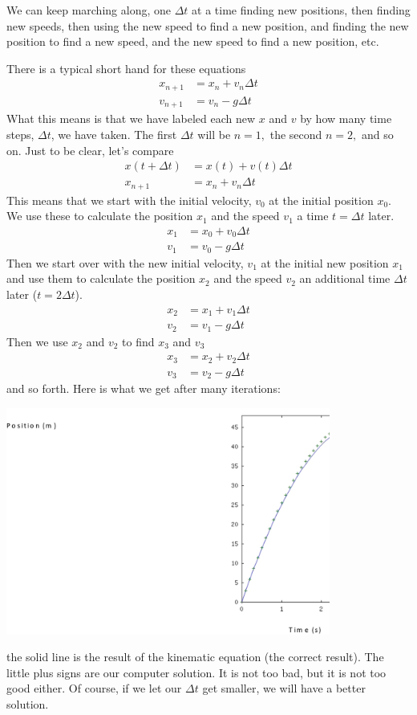 \documentclass[twoside,11pt,ShortChapTitles]{BYUTextbook}
\begin{document}
We can keep marching along, one $\Delta t$ at a time finding new positions,
then finding new speeds, then using the new speed to find a new position, and
finding the new position to find a new speed, and the new speed to find a new
position, etc.

There is a typical short hand for these equations \begin{align*}
x_{n+1}  & =x_{n}+v_{n}\Delta t\\
v_{n+1}  & =v_{n}-g\Delta t
\end{align*}
What this means is that we have labeled each new $x$ and $v$ by how many time
steps, $\Delta t$, we have taken. The first $\Delta t$ will be $n=1,$ the
second $n=2,$ and so on. Just to be clear, let's compare \begin{align*}
x(t+\Delta t)  & =x(t)+v(t)\Delta t\\
x_{n+1}  & =x_{n}+v_{n}\Delta t
\end{align*}
This means that we start with the initial velocity, $v_{0}$ at the initial
position $x_{0}.$ We use these to calculate the position $x_{1}$ and the speed
$v_{1}$ a time $t=\Delta t$ later.
\begin{align*}
x_{1}  & =x_{0}+v_{0}\Delta t\\
v_{1}  & =v_{0}-g\Delta t
\end{align*}
Then we start over with the new initial velocity, $v_{1}$ at the initial new
position $x_{1}$ and use them to calculate the position $x_{2}$ and the speed
$v_{2}$ an additional time $\Delta t$ later ($t=2\Delta t$).
\begin{align*}
x_{2}  & =x_{1}+v_{1}\Delta t\\
v_{2}  & =v_{1}-g\Delta t
\end{align*}
Then we use $x_{2}$ and $v_{2}$ to find $x_{3}$ and $v_{3}$
\begin{align*}
x_{3}  & =x_{2}+v_{2}\Delta t\\
v_{3}  & =v_{2}-g\Delta t
\end{align*}
and so forth. Here is what we get after many iterations:


\begin{center}
\includegraphics[width=0.8\textwidth]{Lab7_figs/MLQ2XV07.png}

\end{center}
the solid line is the result of the kinematic equation (the correct result).
The little plus signs are our computer solution. It is not too bad, but it is
not too good either. Of course, if we let our $\Delta t$ get smaller, we will
have a better solution.
\end{document}
